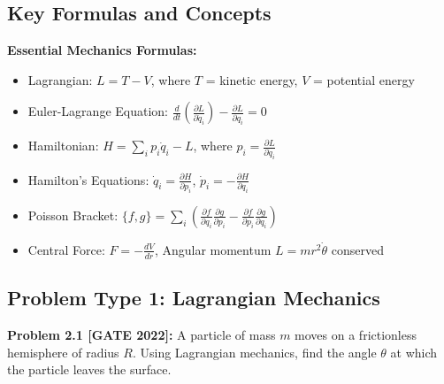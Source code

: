 \documentclass[12pt,a4paper]{article}
\begin{document}
\subsection{Key Formulas and Concepts}

\begin{theorem}
\textbf{Essential Mechanics Formulas:}
\begin{itemize}
    \item Lagrangian: $L = T - V$, where $T$ = kinetic energy, $V$ = potential energy
    \item Euler-Lagrange Equation: $\frac{d}{dt}\left(\frac{\partial L}{\partial \dot{q}_i}\right) - \frac{\partial L}{\partial q_i} = 0$
    \item Hamiltonian: $H = \sum_i p_i\dot{q}_i - L$, where $p_i = \frac{\partial L}{\partial \dot{q}_i}$
    \item Hamilton's Equations: $\dot{q}_i = \frac{\partial H}{\partial p_i}$, $\dot{p}_i = -\frac{\partial H}{\partial q_i}$
    \item Poisson Bracket: $\{f,g\} = \sum_i \left(\frac{\partial f}{\partial q_i}\frac{\partial g}{\partial p_i} - \frac{\partial f}{\partial p_i}\frac{\partial g}{\partial q_i}\right)$
    \item Central Force: $F = -\frac{dV}{dr}$, Angular momentum $L = mr^2\dot{\theta}$ conserved
\end{itemize}
\end{theorem}

\subsection{Problem Type 1: Lagrangian Mechanics}

\textbf{Problem 2.1 [GATE 2022]:} A particle of mass $m$ moves on a frictionless hemisphere of radius $R$. Using Lagrangian mechanics, find the angle $\theta$ at which the particle leaves the surface.
\end{document}
